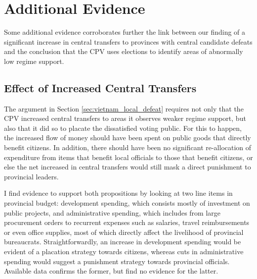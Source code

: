 \documentclass[12pt]{article}
\newcommand{\1}{\mathbbm{1}}
\begin{document}
\section{Additional Evidence}
\label{sec:additional}

Some additional evidence corroborates further the link between our finding of a significant increase in central transfers to provinces with central candidate defeats and the conclusion that the CPV uses elections to identify areas of abnormally low regime support.

\subsection{Effect of Increased Central Transfers}

The argument in Section \ref{sec:vietnam_local_defeat} requires not only that the CPV increased central transfers to areas it observes weaker regime support, but also that it did so to placate the dissatisfied voting public. For this to happen, the increased flow of money should have been spent on public goods that directly benefit citizens. In addition, there should have been no significant re-allocation of expenditure from items that benefit local officials to those that benefit citizens, or else the net increased in central transfers would still mask a direct punishment to provincial leaders. 

I find evidence to support both propositions by looking at two line items in provincial budget: development spending, which consists mostly of investment on public projects, and administrative spending, which includes from large procurement orders to recurrent expenses such as salaries, travel reimbursements or even office supplies, most of which directly affect the livelihood of provincial bureaucrats. Straightforwardly, an increase in development spending would be evident of a placation strategy towards citizens, whereas cuts in administrative spending would suggest a punishment strategy towards provincial officials. Available data confirms the former, but find no evidence for the latter.


\end{document}
